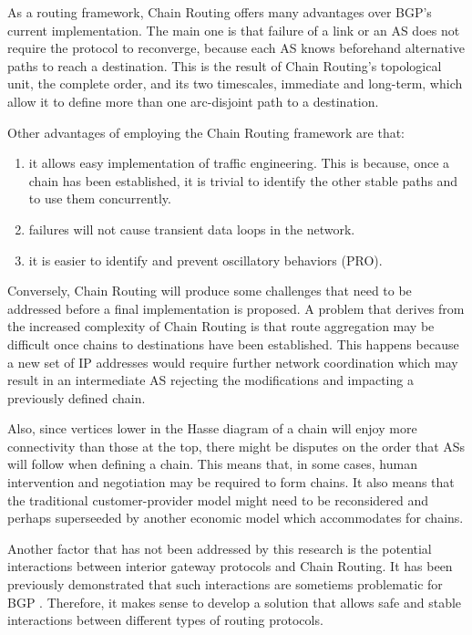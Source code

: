 \documentclass[5p,twocolumn]{elsarticle}
\begin{document}
As a routing framework, Chain Routing offers many advantages over BGP's current implementation. The main one is that failure of a link or an AS does not require the protocol to reconverge, because each AS knows beforehand alternative paths to reach a destination. This is the result of Chain Routing's topological unit, the complete order, and its two timescales, immediate and long-term, which allow it to define more than one arc-disjoint path to a destination.

Other advantages of employing the Chain Routing framework are that:

\begin{enumerate}
	\item it allows easy implementation of traffic engineering. This is because, once a chain has been established, it is trivial to identify the other stable paths and to use them concurrently.
	\item failures will not cause transient data loops in the network.
	\item it is easier to identify and prevent oscillatory behaviors (PRO).
\end{enumerate}

Conversely, Chain Routing will produce some challenges that need to be addressed before a final implementation is proposed. A problem that derives from the increased complexity of Chain Routing is that route aggregation may be difficult once chains to destinations have been established. This happens because a new set of IP addresses would require further network coordination which may result in an intermediate AS rejecting the modifications and impacting a previously defined chain.

Also, since vertices lower in the Hasse diagram of a chain will enjoy more connectivity than those at the top, there might be disputes on the order that ASs will follow when defining a chain. This means that, in some cases, human intervention and negotiation may be required to form chains. It also means that the traditional customer-provider model \cite{Gao2000a} might need to be reconsidered and perhaps superseeded by another economic model which accommodates for chains.

Another factor that has not been addressed by this research is the potential interactions between interior gateway protocols and Chain Routing. It has been previously demonstrated that such interactions are sometiems problematic for BGP \cite{Labovitz1999}. Therefore, it makes sense to develop a solution that allows safe and stable interactions between different types of routing protocols. 
\end{document}
